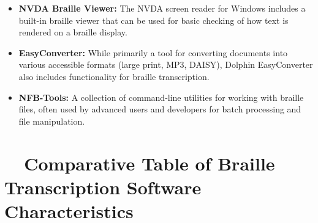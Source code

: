 \begin{itemize}
	\item \textbf{NVDA Braille Viewer:} The NVDA screen reader for Windows includes a built-in braille viewer that can be used for basic checking of how text is rendered on a braille display.
	\item \textbf{EasyConverter:} While primarily a tool for converting documents into various accessible formats (large print, MP3, DAISY), Dolphin EasyConverter also includes functionality for braille transcription.
	\item \textbf{NFB-Tools:} A collection of command-line utilities for working with braille files, often used by advanced users and developers for batch processing and file manipulation.
\end{itemize}

\section{~~Comparative Table of Braille Transcription Software Characteristics}
\label{sec:comparative-table-of-braille-transcription-software-characteristics}

